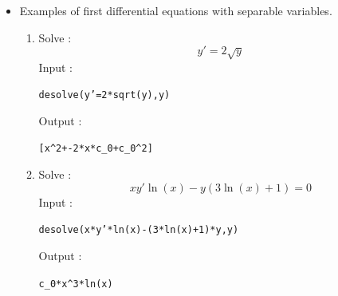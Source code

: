 \documentclass[a4paper,11pt]{book}
\begin{document}
\begin{itemize}
\begin{enumerate}
Output  :
\begin{center}{\tt (c\_0)/((x\verb|^|2-1)/(x\verb|^|2))}\end{center}
\item
Solve :
$$x(x^2-1)y'+2y=x^2$$
Input :
\begin{center}{\tt desolve(x*(x\verb|^|2-1)*y'+2*y=x\verb|^|2,y)}\end{center}
Output  :
\begin{center}{\tt (ln(x)+c\_0)/((x\verb|^|2-1)/(x\verb|^|2))}\end{center}
\item
If the variable is $t$ instead of $x$, for example  :
$$t(t^2-1)y'(t)+2y(t)=t^2$$
Input :
\begin{center}{\tt desolve(t*(t\verb|^|2-1)*diff(y(t),t)+2*y(t)=(t\verb|^|2),y(t))}\end{center}
Output :
\begin{center}{\tt (ln(t)+c\_0)/((t\verb|^|2-1)/(t\verb|^|2))}\end{center}
\item
Solve :
$$x(x^2-1)y'+2y=x^2,y(2)=0$$
Input :
\begin{center}{\tt desolve([x*(x\verb|^|2-1)*y'+2*y=x\verb|^|2,y(0)=1],y)}\end{center}
Output  :
\begin{center}{\tt [(ln(x)-ln(2))*1/(x\verb|^|2-1)*x\verb|^|2]}\end{center}
\item
Solve :
$$\sqrt{1+x^2}y'-x-y=\sqrt{1+x^2}$$
Input :
\begin{center}{\tt desolve(y'*sqrt(1+x\verb|^|2)-x-y-sqrt(1+x\verb|^|2),y)}\end{center}
Output  :
\begin{center}{\tt (-c\_0+ln(sqrt(x\verb|^|2+1)-x))/(x-sqrt(x\verb|^|2+1))}\end{center}
\end{enumerate}

\item Examples of first differential equations with separable variables.
\begin{enumerate}
\item Solve :
$$y'=2\sqrt{y}$$
Input :
\begin{center}{\tt desolve(y'=2*sqrt(y),y)}\end{center}
Output  :
\begin{center}{\tt [x\verb|^|2+-2*x*c\_0+c\_0\verb|^|2]}\end{center}
\item
Solve :
$$xy'\ln(x)-y(3\ln(x)+1)=0$$
Input :
\begin{center}{\tt desolve(x*y'*ln(x)-(3*ln(x)+1)*y,y)}\end{center}
Output  :
\begin{center}{\tt c\_0*x\verb|^|3*ln(x)}\end{center}
\end{enumerate}


\end{itemize}
\end{document}
